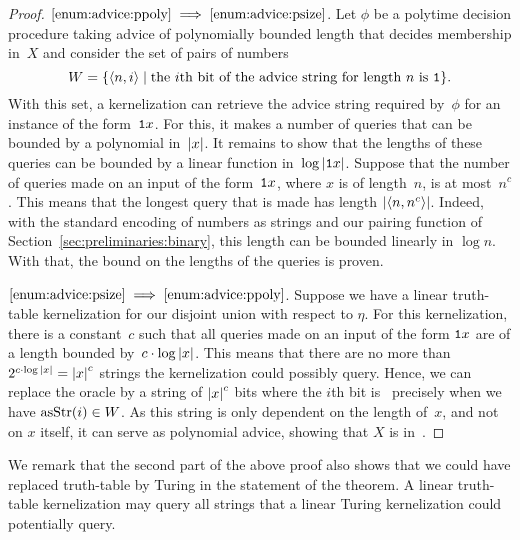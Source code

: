 \begin{proof}
$\ref{enum:advice:ppoly} \implies \ref{enum:advice:psize}$.
  Let $\phi$ be a polytime decision procedure taking advice of polynomially bounded length that decides membership in~$X$ and consider the set of pairs of numbers
  \begin{equation*}
    W = \{{\langle n, i\rangle} \;|\; \text{the $i$th bit of the advice string for length~$n$ is \textnormal{\texttt{1}}}\}.
  \end{equation*}
  With this set, a kernelization can retrieve the advice string required by~$\phi$ for an instance of the form~$\textnormal{\texttt{1}}x$.
  For this, it makes a number of queries that can be bounded by a polynomial in~${\lvert x\rvert}$.
  It remains to show that the lengths of these queries can be bounded by a linear function in~$\log {\lvert\textnormal{\texttt{1}}x\rvert}$.
  Suppose that the number of queries made on an input of the form~$\textnormal{\texttt{1}}x$, where $x$ is of length~$n$, is at most~$n^c$.
  This means that the longest query that is made has length ${\lvert{\langle n, n^c\rangle}\rvert}$.
  Indeed, with the standard encoding of numbers as strings and our pairing function of Section~\ref{sec:preliminaries:binary}, this length can be bounded linearly in $\log n$.
  With that, the bound on the lengths of the queries is proven.

$\ref{enum:advice:psize} \implies \ref{enum:advice:ppoly}$.
  Suppose we have a linear truth-table kernelization for our disjoint union with respect to $\eta$.
  For this kernelization, there is a constant~$c$ such that all queries made on an input of the form $\textnormal{\texttt{1}}x$ are of a length bounded by~$c \cdot \log {\lvert x\rvert}$.
  This means that there are no more than $2^{c \cdot \log {\lvert x\rvert}} = {\lvert x\rvert}^c$ strings the kernelization could possibly query.
  Hence, we can replace the oracle by a string of ${\lvert x\rvert}^c$ bits where the $i$th bit is~ precisely when we have $\operatorname{asStr}(i) \in W$.
  As this string is only dependent on the length of~$x$, and not on $x$ itself, it can serve as polynomial advice, showing that $X$ is in~.
\end{proof}

We remark that the second part of the above proof also shows that we could have replaced truth-table by Turing in the statement of the theorem.
A linear truth-table kernelization may query all strings that a linear Turing kernelization could potentially query.

